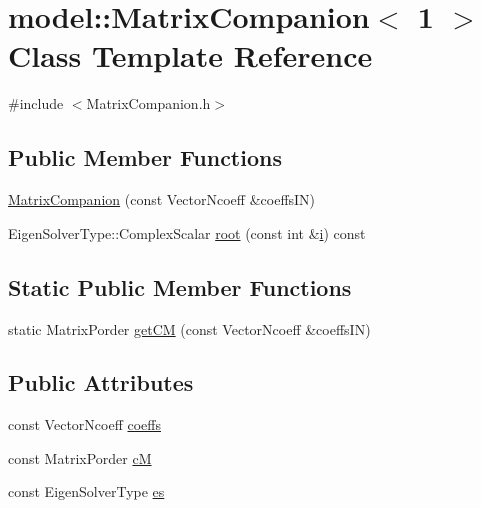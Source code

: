 \hypertarget{classmodel_1_1_matrix_companion_3_011_01_4}{}\section{model\+:\+:Matrix\+Companion$<$ 1 $>$ Class Template Reference}
\label{classmodel_1_1_matrix_companion_3_011_01_4}


{\ttfamily \#include $<$Matrix\+Companion.\+h$>$}

\subsection*{Public Member Functions}
\begin{DoxyCompactItemize}
\item 
\hyperlink{classmodel_1_1_matrix_companion_3_011_01_4_a87b6f71b22f51e3cf8584757eebeb7e8}{Matrix\+Companion} (const Vector\+Ncoeff \&coeffs\+I\+N)
\item 
Eigen\+Solver\+Type\+::\+Complex\+Scalar \hyperlink{classmodel_1_1_matrix_companion_3_011_01_4_a6341c060a009e520c9dacf0e1226d94d}{root} (const int \&\hyperlink{_cubic_spline_intersection_8m_a6f6ccfcf58b31cb6412107d9d5281426}{i}) const 
\end{DoxyCompactItemize}
\subsection*{Static Public Member Functions}
\begin{DoxyCompactItemize}
\item 
static Matrix\+Porder \hyperlink{classmodel_1_1_matrix_companion_3_011_01_4_a241752579c3d73adf19100b6cccc8883}{get\+C\+M} (const Vector\+Ncoeff \&coeffs\+I\+N)
\end{DoxyCompactItemize}
\subsection*{Public Attributes}
\begin{DoxyCompactItemize}
\item 
const Vector\+Ncoeff \hyperlink{classmodel_1_1_matrix_companion_3_011_01_4_add63fcd31a8b747d4d996a595975b3be}{coeffs}
\item 
const Matrix\+Porder \hyperlink{classmodel_1_1_matrix_companion_3_011_01_4_aef1f7a1bcdc3a6766fb680600a68d979}{c\+M}
\item 
const Eigen\+Solver\+Type \hyperlink{classmodel_1_1_matrix_companion_3_011_01_4_a3391410a043a5ef06a5db7ee4d2e3de5}{es}
\end{DoxyCompactItemize}


